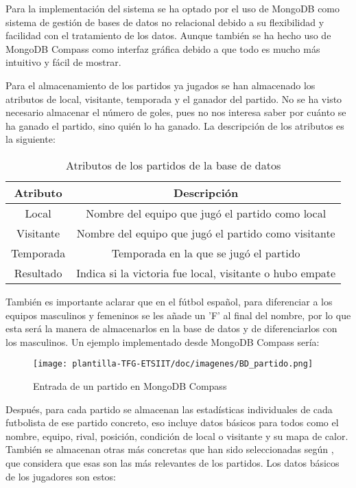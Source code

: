 Para la implementación del sistema se ha optado por el uso de MongoDB como sistema de gestión de bases de datos no relacional debido a su flexibilidad y facilidad con el tratamiento de los datos. Aunque también se ha hecho uso de MongoDB Compass como interfaz gráfica debido a que todo es mucho más intuitivo y fácil de mostrar.

Para el almacenamiento de los partidos ya jugados se han almacenado los atributos de local, visitante, temporada y el ganador del partido. No se ha visto necesario almacenar el número de goles, pues no nos interesa saber por cuánto se ha ganado el partido, sino quién lo ha ganado. La descripción de los atributos es la siguiente:

\begin{table}[H]
    \centering
    \begin{tabular}{|c|c|}
        \hline
        \textbf{Atributo} & \textbf{Descripción} \\
        \hline
        Local & Nombre del equipo que jugó el partido como local \\
        \hline
        Visitante & Nombre del equipo que jugó el partido como visitante \\
        \hline
        Temporada & Temporada en la que se jugó el partido \\
        \hline
        Resultado & Indica si la victoria fue local, visitante o hubo empate \\
        \hline
    \end{tabular}
    \caption{Atributos de los partidos de la base de datos}
    \label{tab:ejemplo}
\end{table}

También es importante aclarar que en el fútbol español, para diferenciar a los equipos masculinos y femeninos se les añade un 'F' al final del nombre, por lo que esta será la manera de almacenarlos en la base de datos y de diferenciarlos con los masculinos. Un ejemplo implementado desde MongoDB Compass sería:

\begin{figure}[H]
    \centering
    \texttt{[image: plantilla-TFG-ETSIIT/doc/imagenes/BD\_partido.png]}
    \caption{Entrada de un partido en MongoDB Compass}
    \label{fig:etiqueta-imagen}
\end{figure}

Después, para cada partido se almacenan las estadísticas individuales de cada futbolista de ese partido concreto, eso incluye datos básicos para todos como el nombre, equipo, rival, posición, condición de local o visitante y su mapa de calor. También se almacenan otras más concretas que han sido seleccionadas según \cite{just-estadisticas}, que considera que esas son las más relevantes de los partidos. Los datos básicos de los jugadores son estos:

